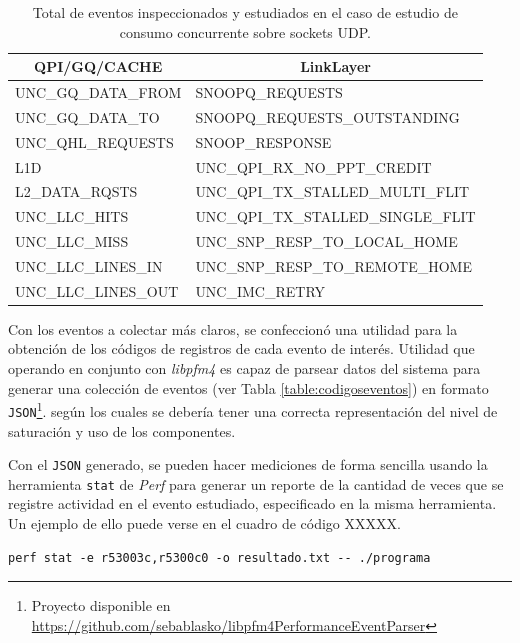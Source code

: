 \begin{table}[h!]
\centering
\begin{tabular}{l|l}
\multicolumn{1}{c|}{{\bf QPI/GQ/CACHE}} & \multicolumn{1}{c}{{\bf LinkLayer}} \\ \hline
{ UNC\_GQ\_DATA\_FROM} & SNOOPQ\_REQUESTS \\
{ UNC\_GQ\_DATA\_TO} & SNOOPQ\_REQUESTS\_OUTSTANDING \\
{ UNC\_QHL\_REQUESTS} & SNOOP\_RESPONSE \\
{ L1D} & UNC\_QPI\_RX\_NO\_PPT\_CREDIT \\
{ L2\_DATA\_RQSTS} & UNC\_QPI\_TX\_STALLED\_MULTI\_FLIT \\
{ UNC\_LLC\_HITS} & UNC\_QPI\_TX\_STALLED\_SINGLE\_FLIT \\
{ UNC\_LLC\_MISS} & UNC\_SNP\_RESP\_TO\_LOCAL\_HOME \\
{ UNC\_LLC\_LINES\_IN} & UNC\_SNP\_RESP\_TO\_REMOTE\_HOME \\
{ UNC\_LLC\_LINES\_OUT} & UNC\_IMC\_RETRY
\end{tabular}
\caption{Total de eventos inspeccionados y estudiados en el caso de estudio de consumo concurrente sobre sockets UDP.}
\label{table:eventos}
\end{table}

Con los eventos a colectar más claros, se confeccionó una utilidad para la obtención de los códigos de registros de cada evento de interés. Utilidad que operando en conjunto con \emph{libpfm4} es capaz de parsear datos del sistema para generar una colección de eventos (ver Tabla \ref{table:codigoseventos}) en formato \verb=JSON=\footnote{Proyecto disponible en \url{https://github.com/sebablasko/libpfm4PerformanceEventParser}}. según los cuales se debería tener una correcta representación del nivel de saturación y uso de los componentes.

Con el \verb=JSON= generado, se pueden hacer mediciones de forma sencilla usando la herramienta \verb=stat= de \emph{Perf} para generar un reporte de la cantidad de veces que se registre actividad en el evento estudiado, especificado en la misma herramienta. Un ejemplo de ello puede verse en el cuadro de código XXXXX.

\lstset{language=Bash,
		breaklines=true,
		frame=single
		}
\begin{lstlisting}[caption=Ejemplo de uso de Perf para colectar datos de una colección de eventos sobre un script llamado programa. En éste caso se configura para colectar datos de 2 eventos y dejar el reporte de salida en un archivo resultado.txt]
perf stat -e r53003c,r5300c0 -o resultado.txt -- ./programa
\end{lstlisting}

